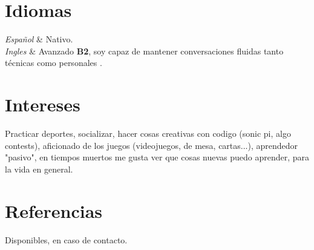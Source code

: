 \documentclass[
    changecolor={111, 156, 45}, 
]{cv-roald}
\begin{document}
\section*{Idiomas}
\begin{tabularcv}
\textit{Español}     &	Nativo. \\
\textit{Ingles}      &  Avanzado \textbf{B2}, soy capaz de mantener conversaciones fluidas tanto técnicas como personales .\\
\end{tabularcv}

\section*{Intereses}
Practicar deportes, socializar, hacer cosas creativas con codigo (sonic pi, algo contests), aficionado de los juegos (videojuegos, de mesa, cartas...), aprendedor "pasivo", en tiempos muertos me gusta ver que cosas nuevas puedo aprender, para la vida en general.

\section*{Referencias}
Disponibles, en caso de contacto.
    
\end{document}
